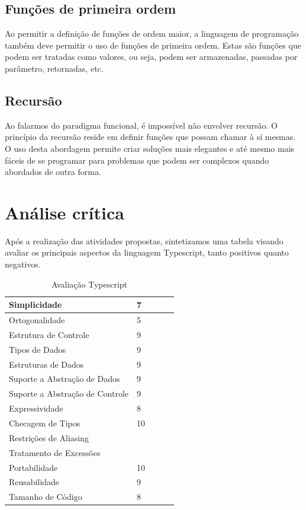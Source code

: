 \documentclass[rel_mlp]{iiufrgs}
\numberwithin{figure}{chapter}
\begin{document}
\section{Funções de primeira ordem}

Ao permitir a definição de funções de ordem maior, a linguagem de programação também deve permitir o uso de funções de primeira ordem. Estas são funções que podem ser tratadas como valores, ou seja, podem ser armazenadas, passadas por parâmetro, retornadas, etc.


\section{Recursão}

Ao falarmos do paradigma funcional, é impossível não envolver recursão. O princípio da recursão reside em definir funções que possam chamar à sí mesmas. O uso desta abordagem permite criar soluções mais elegantes e até mesmo mais fáceis de se programar para problemas que podem ser complexos quando abordados de outra forma.


%
\chapter{Análise crítica}

Após a realização das atividades propostas, sintetizamos uma tabela visando avaliar os principais aspectos da linguagem Typescript, tanto positivos quanto negativos.

\begin{table}[h]
\centering
\caption{Avaliação Typescript}
\label{aval}
\begin{tabular}{|l|l|l|l|l|}
\hline
Simplicidade          			&  7	&  \\ \hline
Ortogonalidade        			&  5	&  \\ \hline
Estrutura de Controle 			&  9	&  \\ \hline
Tipos de Dados        			&  9	&  \\ \hline
Estruturas de Dados   			&  9	&  \\ \hline
Suporte a Abstração de Dados    &  9	&  \\ \hline
Suporte a Abstração de Controle	&  9	&  \\ \hline
Expressividade        			&  8	&  \\ \hline
Checagem de Tipos     			&  10	&  \\ \hline
Restrições de Aliasing        	&  		&  \\ \hline
Tratamento de Excessões 		&  		&  \\ \hline
Portabilidade        			&  10	&  \\ \hline
Reusabilidade          			&  9	&  \\ \hline
Tamanho de Código        		&  8	&  \\ \hline
\end{tabular}
\end{table}
\end{document}
